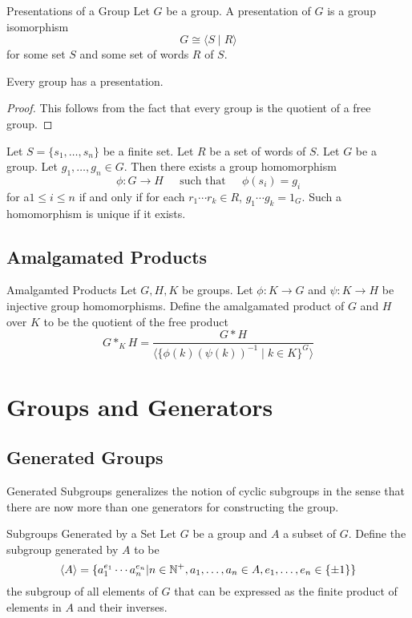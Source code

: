 \documentclass[a4paper]{article}
\begin{document}
\begin{defn}{Presentations of a Group}{} Let $G$ be a group. A presentation of $G$ is a group isomorphism $$G\cong\langle S\;|\;R\rangle$$ for some set $S$ and some set of words $R$ of $S$. 
\end{defn}

\begin{prp}{}{} Every group has a presentation. \tcbline
\begin{proof}
This follows from the fact that every group is the quotient of a free group. 
\end{proof}
\end{prp}

\begin{prp}{}{} Let $S=\{s_1,\dots,s_n\}$ be a finite set. Let $R$ be a set of words of $S$. Let $G$ be a group. Let $g_1,\dots,g_n\in G$. Then there exists a group homomorphism $$\phi:G\to H\;\;\;\;\text{ such that }\;\;\;\;\phi(s_i)=g_i$$ for a$1\leq i\leq n$ if and only if for each $r_1\cdots r_k\in R$, $g_1\cdots g_k=1_G$. Such a homomorphism is unique if it exists. 
\end{prp}

\subsection{Amalgamated Products}
\begin{defn}{Amalgamted Products}{} Let $G,H,K$ be groups. Let $\phi:K\to G$ and $\psi:K\to H$ be injective group homomorphisms. Define the amalgamated product of $G$ and $H$ over $K$ to be the quotient of the free product $$G\ast_KH=\frac{G\ast H}{\langle\{\phi(k)(\psi(k))^{-1}\;|\;k\in K\}^G\rangle}$$
\end{defn}

\pagebreak
\section{Groups and Generators}
\subsection{Generated Groups}
Generated Subgroups generalizes the notion of cyclic subgroups in the sense that there are now more than one generators for constructing the group. 

\begin{defn}{Subgroups Generated by a Set}{} Let $G$ be a group and $A$ a subset of $G$. Define the subgroup generated by $A$ to be $$\langle A\rangle=\{a_1^{e_1}\cdots a_n^{e_n}|n\in\mathbb{N}^+, a_1,\dots,a_n\in A, e_1,\dots,e_n\in\{\pm1\}\}$$ the subgroup of all elements of $G$ that can be expressed as the finite product of elements in $A$ and their inverses. 
\end{defn}
\end{document}
